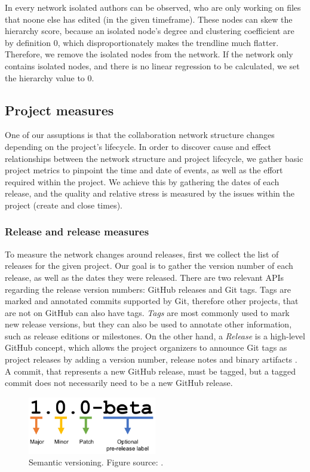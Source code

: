 In every network isolated authors can be observed, who are only working on files that noone else has edited (in the given timeframe). These nodes can skew the hierarchy score, because an isolated node's degree and clustering coefficient are by definition 0, which disproportionately makes the trendline much flatter. Therefore, we remove the isolated nodes from the network. If the network only contains isolated nodes, and there is no linear regression to be calculated, we set the hierarchy value to 0.

\subsection{Project measures}

One of our assuptions is that the collaboration network structure changes depending on the project's lifecycle. In order to discover cause and effect relationships between the network structure and project lifecycle, we gather basic project metrics to pinpoint the time and date of events, as well as the effort required within the project. We achieve this by gathering the dates of each release, and the quality and relative stress is measured by the issues within the project (create and close times).

\subsubsection{Release and release measures}

To measure the network changes around releases, first we collect the list of releases for the given project. Our goal is to gather the version number of each release, as well as the dates they were released. There are two relevant APIs regarding the release version numbers: GitHub releases and Git tags. Tags are marked and annotated commits supported by Git, therefore other projects, that are not on GitHub can also have tags. \textit{Tags} are most commonly used to mark new release versions, but they can also be used to annotate other information, such as release editions or milestones. On the other hand, a \textit{Release} is a high-level GitHub concept, which allows the project organizers to announce Git tags as project releases by adding a version number, release notes and binary artifacts \cite{olsonReleaseYourSoftware2013}. A commit, that represents a new GitHub release, must be tagged, but a tagged commit does not necessarily need to be a new GitHub release.

\begin{figure}
    \centering
    \includegraphics[width=0.5\textwidth]{figures/semantic-versioning.png}
    \caption{Semantic versioning. Figure source: \cite{mariogripSemanticVersioningUT2018}.}
    \label{fig:semver}
\end{figure}

